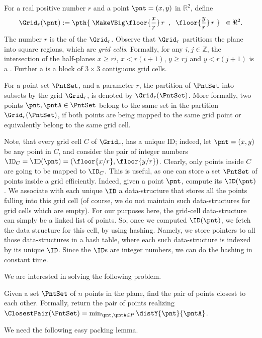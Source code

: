 For a real positive number $r$ and a point $\pnt = (x,y)$ in
$\mathbb{R}^2$, define 
\[
\Grid_r(\pnt) := \pth{\;\MakeVBig\floor{\frac{x}{r}} \, r \;\;,\;\;
   \floor{\frac{y}{r}} \, r \;} \;\; \in \Re^2.
\]
The number $r$ is the  of the 
$\Grid_r$. Observe that $\Grid_r$ partitions the plane into square
regions, which are \emph{grid cells}. Formally, for any
$i,j \in \mathbb{Z}$, the intersection of the half-planes
$x \geq r i$, $x < r(i+1)$, $y \geq r j$ and $y < r(j+1)$ is a
.  Further a  is a block of
$3\times 3$ contiguous grid cells.

For a point set $\PntSet$, and a parameter $r$, the partition of
$\PntSet$ into subsets by the grid $\Grid_r$, is denoted by
$\Grid_r(\PntSet)$. More formally, two points $\pnt,\pntA \in \PntSet$
belong to the same set in the partition $\Grid_r(\PntSet)$, if both points
are being mapped to the same grid point or equivalently belong to the
same grid cell.

Note, that every grid cell $C$ of $\Grid_r$, has a unique ID; indeed,
let $\pnt = (x,y)$ be any point in $C$, and consider the pair of
integer numbers $\ID_C = \ID(\pnt) = (\floor{x/r},
\floor{y/r})$. Clearly, only points inside $C$ are going to be mapped
to $\ID_C$. This is useful, as one can store a set $\PntSet$ of points
inside a grid efficiently.  Indeed, given a point $\pnt$, compute its
$\ID(\pnt)$. We associate with each unique $\ID$ a data-structure that
stores all the points falling into this grid cell (of course, we do
not maintain such data-structures for grid cells which are empty).
For our purposes here, the grid-cell data-structure can simply be a
linked list of points.  So, once we computed $\ID(\pnt)$, we fetch the
data structure for this cell, by using hashing.  Namely, we store
pointers to all those data-structures in a hash table, where each such
data-structure is indexed by its unique $\ID$.  Since the $\ID$s are
integer numbers, we can do the hashing in constant time.

\bigskip

We are interested in solving the following problem.
\begin{problem}
    Given a set $\PntSet$ of $n$ points in the plane, find the pair of
    points closest to each other. Formally, return the pair of points
    realizing
    $\ClosestPair(\PntSet) = \min_{\pnt,\pntA \in P}
    \distY{\pnt}{\pntA}$.
\end{problem}

We need the following easy packing lemma.


